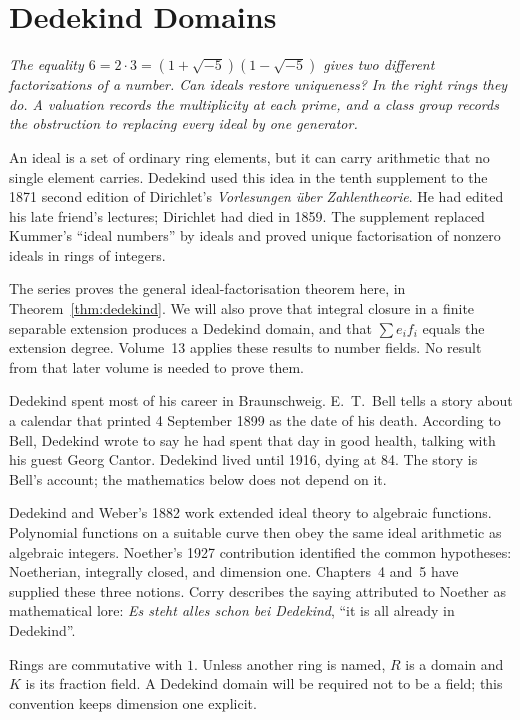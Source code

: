 \chapter{Dedekind Domains}

\begin{center}\itshape
The equality $6=2\cdot3=(1+\sqrt{-5})(1-\sqrt{-5})$ gives two different factorizations of a number. Can ideals restore uniqueness? In the right rings they do. A valuation records the multiplicity at each prime, and a class group records the obstruction to replacing every ideal by one generator.
\end{center}

An ideal is a set of ordinary ring elements, but it can carry arithmetic that no single element carries. Dedekind used this idea in the tenth supplement to the 1871 second edition of Dirichlet's \emph{Vorlesungen über Zahlentheorie}. He had edited his late friend's lectures; Dirichlet had died in 1859. The supplement replaced Kummer's ``ideal numbers'' by ideals and proved unique factorisation of nonzero ideals in rings of integers.

The series proves the general ideal-factorisation theorem here, in Theorem~\ref{thm:dedekind}. We will also prove that integral closure in a finite separable extension produces a Dedekind domain, and that $\sum e_if_i$ equals the extension degree. Volume~13 applies these results to number fields. No result from that later volume is needed to prove them.

Dedekind spent most of his career in Braunschweig. E.~T.~Bell tells a story about a calendar that printed 4 September 1899 as the date of his death. According to Bell, Dedekind wrote to say he had spent that day in good health, talking with his guest Georg Cantor. Dedekind lived until 1916, dying at 84. The story is Bell's account; the mathematics below does not depend on it.

Dedekind and Weber's 1882 work extended ideal theory to algebraic functions. Polynomial functions on a suitable curve then obey the same ideal arithmetic as algebraic integers. Noether's 1927 contribution identified the common hypotheses: Noetherian, integrally closed, and dimension one. Chapters~4 and~5 have supplied these three notions. Corry describes the saying attributed to Noether as mathematical lore: \emph{Es steht alles schon bei Dedekind}, ``it is all already in Dedekind''.

Rings are commutative with $1$. Unless another ring is named, $R$ is a domain and $K$ is its fraction field. A Dedekind domain will be required not to be a field; this convention keeps dimension one explicit.

